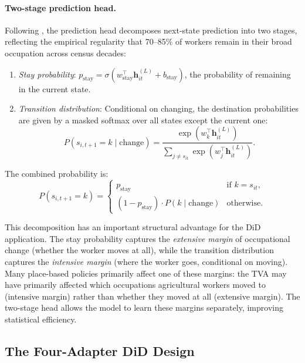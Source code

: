 \documentclass[12pt]{article}
\begin{document}
\paragraph{Two-stage prediction head.} Following \citet{vafa2022career}, the prediction head decomposes next-state prediction into two stages, reflecting the empirical regularity that 70--85\% of workers remain in their broad occupation across census decades:
\begin{enumerate}
\item \textit{Stay probability}: $p_{\text{stay}} = \sigma(w_{\text{stay}}^\top \mathbf{h}_{it}^{(L)} + b_{\text{stay}})$, the probability of remaining in the current state.
\item \textit{Transition distribution}: Conditional on changing, the destination probabilities are given by a masked softmax over all states except the current one:
\begin{equation}\label{eq:transition_softmax}
P(s_{i,t+1} = k \mid \text{change}) = \frac{\exp(w_k^\top \mathbf{h}_{it}^{(L)})}{\sum_{j \neq s_{it}} \exp(w_j^\top \mathbf{h}_{it}^{(L)})}.
\end{equation}
\end{enumerate}
The combined probability is:
\begin{equation}\label{eq:two_stage}
P(s_{i,t+1} = k) = \begin{cases}
p_{\text{stay}} & \text{if } k = s_{it}, \\
(1 - p_{\text{stay}}) \cdot P(k \mid \text{change}) & \text{otherwise.}
\end{cases}
\end{equation}

This decomposition has an important structural advantage for the DiD application. The stay probability captures the \textit{extensive margin} of occupational change (whether the worker moves at all), while the transition distribution captures the \textit{intensive margin} (where the worker goes, conditional on moving). Many place-based policies primarily affect one of these margins: the TVA may have primarily affected which occupations agricultural workers moved to (intensive margin) rather than whether they moved at all (extensive margin). The two-stage head allows the model to learn these margins separately, improving statistical efficiency.

\subsection{The Four-Adapter DiD Design}\label{subsec:four_adapter}
\end{document}
